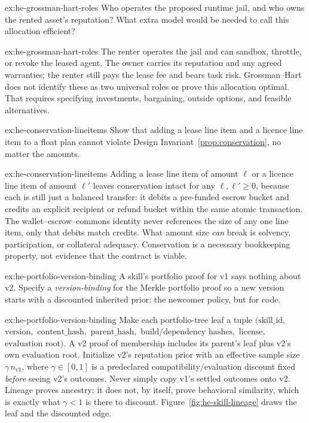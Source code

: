 \documentclass[11pt,a4paper]{article}
\theoremstyle{definition}
\theoremstyle{definition}
\theoremstyle{remark}
\begin{document}
\begin{pdexercise}[kind=Check,rating=1]{ex:he-grossman-hart-roles}
Who operates the proposed runtime jail, and who owns the rented asset's
reputation? What extra model would be needed to call this allocation efficient?
\end{pdexercise}
\begin{pdsolution}{ex:he-grossman-hart-roles}
The renter operates the jail and can sandbox, throttle, or revoke the leased
agent. The owner carries its reputation and any agreed warranties; the renter
still pays the lease fee and bears task risk. Grossman--Hart does not identify
these as two universal roles or prove this allocation optimal. That requires
specifying investments, bargaining, outside options, and feasible alternatives.
\end{pdsolution}
\begin{pdexercise}[kind=Trace,rating=2]{ex:he-conservation-lineitems}
Show that adding a lease line item and a licence line item to a float
  plan cannot violate Design Invariant~\ref{prop:conservation}, no matter the amounts.
\end{pdexercise}
\begin{pdsolution}{ex:he-conservation-lineitems}
Adding a lease line item of amount $\ell$ or a licence line item of
amount $\ell'$ leaves conservation intact for any $\ell,\ell'\ge0$, because each is still
just a balanced transfer: it debits a pre-funded escrow bucket and credits an
explicit recipient or refund bucket within the same atomic transaction. The
wallet--escrow--commons identity never references the size of any one line item,
only that debits match credits. What amount size \emph{can} break is solvency,
participation, or collateral adequacy. Conservation is a necessary
bookkeeping property, not evidence that the contract is viable.
\end{pdsolution}
\begin{pdexercise}[kind=Open,rating=3]{ex:he-portfolio-version-binding}
A skill's portfolio proof for v1 says nothing about v2. Specify a
  \emph{version-binding} for the Merkle portfolio proof so a new version starts
  with a discounted inherited prior: the newcomer policy, but for code.
\end{pdexercise}
\begin{pdsolution}{ex:he-portfolio-version-binding}
Make each portfolio-tree leaf a tuple $(\text{skill\_id},$ $\text{version},$
$\text{content\_hash},$ $\text{parent\_hash},$ $\text{build/dependency hashes},$
$\text{license},$ $\text{evaluation root})$. A v2 proof of membership includes its
parent's leaf plus v2's own evaluation root. Initialize v2's reputation prior
with an effective sample size $\gamma\, n_{v1}$, where $\gamma\in[0,1]$ is a
predeclared compatibility/evaluation discount fixed \emph{before} seeing v2's
outcomes. Never simply copy v1's settled outcomes onto v2. Lineage proves
ancestry; it does not, by itself, prove behavioral similarity, which is exactly
what $\gamma<1$ is there to discount. Figure~\ref{fig:he-skill-lineage} draws
the leaf and the discounted edge.


\end{pdsolution}
\end{document}
